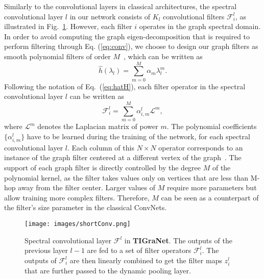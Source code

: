 \documentclass[10pt,journal,compsoc]{IEEEtran}
\begin{document}
	Similarly to the convolutional layers in classical architectures, the spectral convolutional layer $l$ in our network consists of $K_l$ convolutional filters $\mathcal{F}_i^{l}$, as illustrated in Fig.~\ref{fig:conv}. However, each filter $i$ operates in the graph spectral domain. In order to avoid computing the graph eigen-decomposition that is required to perform filtering through Eq. (\ref{eq:conv}), we choose to design our graph filters as smooth polynomial filters of order $M$~\cite{bb:thanou2014learning}, which can be written as
	\begin{equation}
	\hat{h}(\lambda_l) = \sum_{m=0}^M \alpha_m \lambda_l^m .
	\end{equation}
	Following the notation of Eq.~(\ref{eq:hatH}), each filter operator in the spectral convolutional layer $l$ can be written as
	\begin{equation}
	\mathcal{F}_i^{l} = \sum_{m=0}^M \alpha_{i,m}^{l} \mathcal{L}^m ,
	\label{eq:pol_filt_1}
	\end{equation}
	\noindent
	where $\mathcal{L}^m$ denotes the Laplacian matrix of power $m$. The polynomial coefficients $\{\alpha_{i,m}^{l}\}$ have to be learned during the training of the network, for each spectral convolutional layer $l$. Each column of this $N \times N$ operator corresponds to an instance of the graph filter centered at a different vertex of the graph~\cite{bb:thanou2014learning}. The support of each graph filter is directly controlled by the degree $M$ of the polynomial kernel, as the filter takes values only on vertices that are less than M-hop away from the filter center. Larger values of $M$ require more parameters but allow training more complex filters. Therefore, $M$ can be seen as a counterpart of the filter's size parameter in the classical ConvNets.

	\begin{figure}[t!]
		\texttt{[image: images/shortConv.png]}
		\caption{Spectral convolutional layer $\mathcal{F}^{l}$ in {\bf TIGraNet}. The outputs of the previous layer $l-1$ are fed to a set of filter operators $\mathcal{F}_i^{l}$. The outputs of $\mathcal{F}_i^{l}$ are then linearly combined to get the filter maps $z_i^{l}$ that are further passed to the dynamic pooling layer.}
		\label{fig:conv}
	\end{figure}
\end{document}
